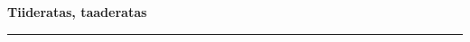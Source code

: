 \documentclass[10pt]{book}
\begin{document}
{
  \samepage
  \raggedbottom
  \raggedright
  \sloppy


  \vspace{0.2in}

  \noindent\begin{minipage}{.1\textwidth}
    \hfill\vspace{0.1in}
  \end{minipage}%
  \noindent\begin{minipage}{.8\textwidth}
    \centering
    \bfseries
    \large Tiideratas, taaderatas
  \end{minipage}%
  \noindent\begin{minipage}{.1\textwidth}
      \hfill\vspace{0.1in}
  \end{minipage}

  \nopagebreak[4]
  \vspace{0.1in}
  \nopagebreak[4]
  \hrule height 0.05ex
  \nopagebreak[4]
  \vspace{-0.05in}




}
\end{document}
